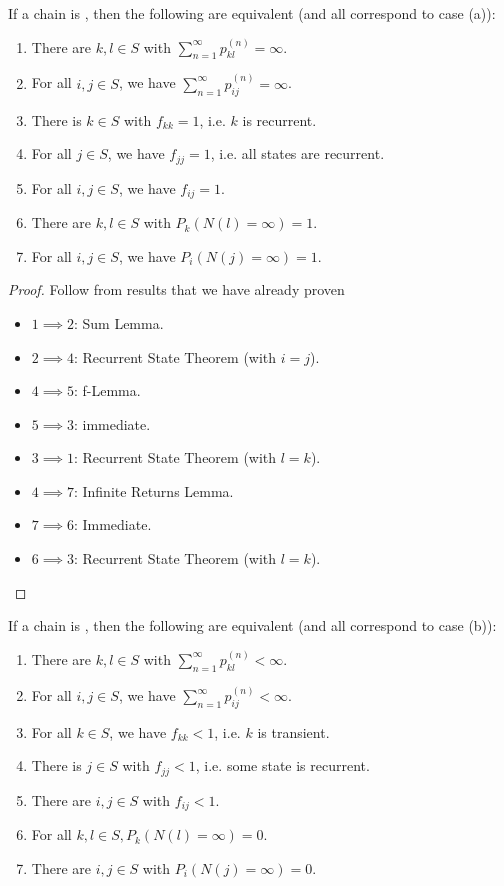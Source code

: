 \documentclass[11pt]{article}
\begin{document}
    
    If a chain is , then the following are equivalent (and all correspond to case (a)):
    \begin{enumerate}
    	\item There are $k, l \in S$ with $\sum_{n=1}^\infty p_{kl}^{(n)} = \infty$.
    	\item For all $i, j \in S$, we have $\sum_{n=1}^\infty p_{ij}^{(n)} = \infty$.
    	\item There is $k \in S$ with $f_{kk} = 1$, i.e. $k$ is recurrent.
    	\item For all $j \in S$, we have $f_{jj} = 1$, i.e. all states are recurrent.
    	\item For all $i, j \in S$, we have $f_{ij} = 1$.
    	\item There are $k, l \in S$ with $P_k(N(l) = \infty) = 1$.
    	\item For all $i, j \in S$, we have $P_i(N(j) = \infty) = 1$.
    \end{enumerate}
    \begin{proof}
    Follow from results that we have already proven
    	\begin{itemize}
    		\item $1 \implies 2$: Sum Lemma.
    		\item $2 \implies 4$: Recurrent State Theorem (with $i = j$).
    		\item $4 \implies 5$: f-Lemma.
    		\item $5 \implies 3$: immediate.
    		\item $3 \implies 1$: Recurrent State Theorem (with $l = k$).
    		\item $4 \implies 7$: Infinite Returns Lemma.
    		\item $7 \implies 6$: Immediate.
    		\item $6 \implies 3$: Recurrent State Theorem (with $l = k$).
    	\end{itemize}
    	
    	
    \end{proof}
    If a chain is , then the following are equivalent (and all correspond to case (b)):
    \begin{enumerate}
    	\item There are $k, l \in S$ with $\sum_{n=1}^\infty p_{kl}^{(n)} < \infty$.
    	\item For all $i, j \in S$, we have $\sum_{n=1}^\infty p_{ij}^{(n)} < \infty$.
    	\item For all $k \in S$, we have $f_{kk} < 1$, i.e. $k$ is transient.
    	\item There is $j \in S$ with $f_{jj} < 1$, i.e. some state is recurrent.
    	\item There are $i, j \in S$ with $f_{ij} < 1$.
    	\item For all $k, l \in S, P_k(N(l) = \infty) = 0$.
    	\item There are $i, j \in S$ with $P_i(N(j) = \infty) = 0$.
    \end{enumerate}    
\end{document}
